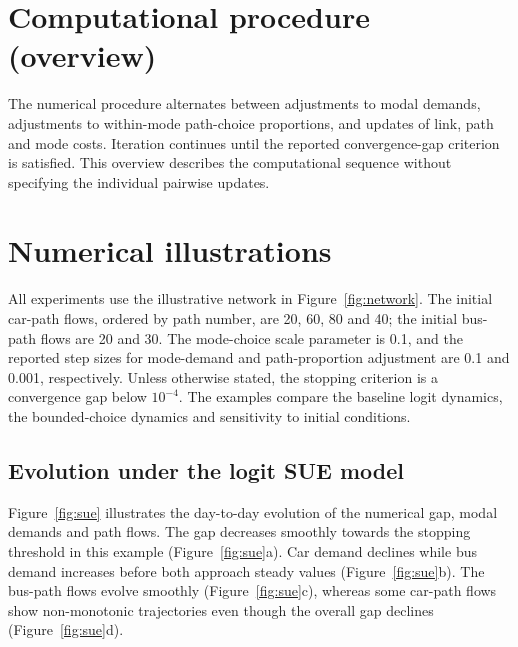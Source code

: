 \documentclass[11pt,a4paper]{article}
\begin{document}
\section{Computational procedure (overview)}\label{sec:algorithm}

The numerical procedure alternates between adjustments to modal demands, adjustments to within-mode path-choice proportions, and updates of link, path and mode costs. Iteration continues until the reported convergence-gap criterion is satisfied. This overview describes the computational sequence without specifying the individual pairwise updates.


\section{Numerical illustrations}\label{sec:numerical}

All experiments use the illustrative network in Figure~\ref{fig:network}. The initial car-path flows, ordered by path number, are 20, 60, 80 and 40; the initial bus-path flows are 20 and 30. The mode-choice scale parameter is 0.1, and the reported step sizes for mode-demand and path-proportion adjustment are 0.1 and 0.001, respectively. Unless otherwise stated, the stopping criterion is a convergence gap below $10^{-4}$. The examples compare the baseline logit dynamics, the bounded-choice dynamics and sensitivity to initial conditions.


\subsection{Evolution under the logit SUE model}

Figure~\ref{fig:sue} illustrates the day-to-day evolution of the numerical gap, modal demands and path flows. The gap decreases smoothly towards the stopping threshold in this example (Figure~\ref{fig:sue}a). Car demand declines while bus demand increases before both approach steady values (Figure~\ref{fig:sue}b). The bus-path flows evolve smoothly (Figure~\ref{fig:sue}c), whereas some car-path flows show non-monotonic trajectories even though the overall gap declines (Figure~\ref{fig:sue}d).
\end{document}
